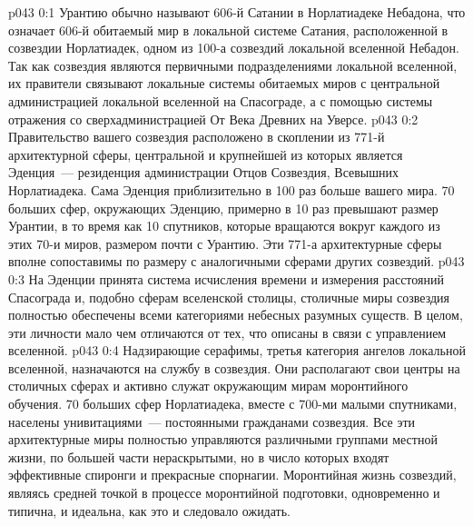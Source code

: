 \author{Малаватия Мелхиседек}
\vs p043 0:1 Урантию обычно называют 606-й Сатании в Норлатиадеке Небадона, что означает 606-й обитаемый мир в локальной системе Сатания, расположенной в созвездии Норлатиадек, одном из 100-а созвездий локальной вселенной Небадон. Так как созвездия являются первичными подразделениями локальной вселенной, их правители связывают локальные системы обитаемых миров с центральной администрацией локальной вселенной на Спасограде, а с помощью системы отражения со сверхадминистрацией От Века Древних на Уверсе.
\vs p043 0:2 \pc Правительство вашего созвездия расположено в скоплении из 771-й архитектурной сферы, центральной и крупнейшей из которых является Эденция~--- резиденция администрации Отцов Созвездия, Всевышних Норлатиадека. Сама Эденция приблизительно в 100 раз больше вашего мира. 70 больших сфер, окружающих Эденцию, примерно в 10 раз превышают размер Урантии, в то время как 10 спутников, которые вращаются вокруг каждого из этих 70-и миров, размером почти с Урантию. Эти 771-а архитектурные сферы вполне сопоставимы по размеру с аналогичными сферами других созвездий.
\vs p043 0:3 \pc На Эденции принята система исчисления времени и измерения расстояний Спасограда и, подобно сферам вселенской столицы, столичные миры созвездия полностью обеспечены всеми категориями небесных разумных существ. В целом, эти личности мало чем отличаются от тех, что описаны в связи с управлением вселенной.
\vs p043 0:4 Надзирающие серафимы, третья категория ангелов локальной вселенной, назначаются на службу в созвездия. Они располагают свои центры на столичных сферах и активно служат окружающим мирам моронтийного обучения. 70 больших сфер Норлатиадека, вместе с 700-ми малыми спутниками, населены унивитациями~--- постоянными гражданами созвездия. Все эти архитектурные миры полностью управляются различными группами местной жизни, по большей части нераскрытыми, но в число которых входят эффективные спиронги и прекрасные спорнагии. Моронтийная жизнь созвездий, являясь средней точкой в процессе моронтийной подготовки, одновременно и типична, и идеальна, как это и следовало ожидать.

